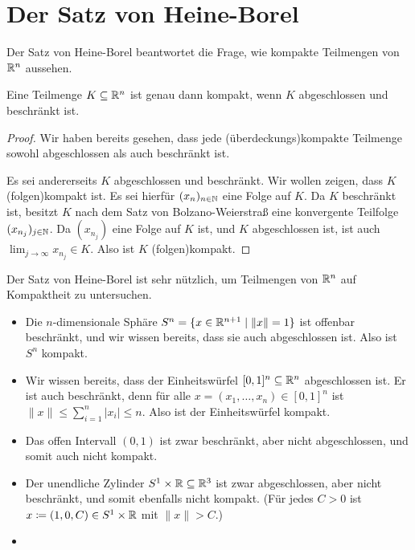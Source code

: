 \documentclass[a4paper,10pt]{article}
\begin{document}
\section{Der Satz von Heine-Borel}
Der Satz von Heine-Borel beantwortet die Frage, wie kompakte Teilmengen von $\mathbb{R}^n$ aussehen.


\begin{thrm}
 Eine Teilmenge $K \subseteq \mathbb{R}^n$ ist genau dann kompakt, wenn $K$ abgeschlossen und beschränkt ist.
\end{thrm}
\begin{proof}
 Wir haben bereits gesehen, dass jede (überdeckungs)kompakte Teilmenge sowohl abgeschlossen als auch beschränkt ist.
 
 Es sei andererseits $K$ abgeschlossen und beschränkt. Wir wollen zeigen, dass $K$ (folgen)kompakt ist. Es sei hierfür $(x_n)_{n \in \mathbb{N}}$ eine Folge auf $K$. Da $K$ beschränkt ist, besitzt $K$ nach dem Satz von Bolzano-Weierstraß eine konvergente Teilfolge $(x_{n_j})_{j \in \mathbb{N}}$. Da $(x_{n_j})$ eine Folge auf $K$ ist, und $K$ abgeschlossen ist, ist auch $\lim_{j \to \infty} x_{n_j} \in K$. Also ist $K$ (folgen)kompakt.
\end{proof}


Der Satz von Heine-Borel ist sehr nützlich, um Teilmengen von $\mathbb{R}^n$ auf Kompaktheit zu untersuchen.


\begin{bsp}
 \begin{itemize}
  \item
   Die $n$-dimensionale Sphäre $S^n = \{x \in \mathbb{R}^{n+1} \mid \|x\| = 1\}$ ist offenbar beschränkt, und wir wissen bereits, dass sie auch abgeschlossen ist. Also ist $S^n$ kompakt.
  \item
   Wir wissen bereits, dass der Einheitswürfel $[0,1]^n \subseteq \mathbb{R}^n$ abgeschlossen ist. Er ist auch beschränkt, denn für alle $x = (x_1, \dotsc, x_n) \in [0,1]^n$ ist $\|x\| \leq \sum_{i=1}^n |x_i| \leq n$. Also ist der Einheitswürfel kompakt.
  \item
   Das offen Intervall $(0,1)$ ist zwar beschränkt, aber nicht abgeschlossen, und somit auch nicht kompakt.
  \item
   Der unendliche Zylinder $S^1 \times \mathbb{R} \subseteq \mathbb{R}^3$ ist zwar abgeschlossen, aber nicht beschränkt, und somit ebenfalls nicht kompakt. (Für jedes $C > 0$ ist $x \coloneqq (1,0,C) \in S^1 \times \mathbb{R}$ mit $\|x\| > C$.)
  \item
   
  \end{itemize}
\end{bsp}
\end{document}
